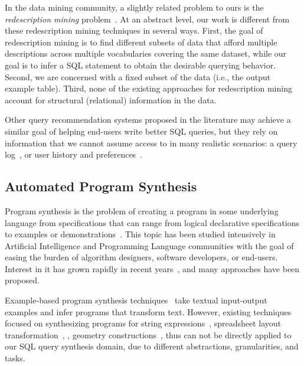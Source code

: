 In the data mining community, a slightly related problem to ours is
the \textit{redescription mining} problem~\cite{Ramakrishnan:2004}.
At an abstract level, our work is different from these redescription mining
techniques in several ways.
First, the goal of redescription mining is to find different subsets of
data that afford multiple descriptions across multiple vocabularies
covering the same dataset, while our goal is to infer a SQL statement
to obtain the desirable querying behavior.
Second, we are concerned with a fixed subset of the data (i.e., the output example table).
Third, none of the existing approaches for redescription mining account for
structural (relational) information in the data. 

Other query recommendation systems proposed in the literature may achieve
a similar goal of helping end-users write better SQL queries, but they rely on information
that we cannot assume access to in many realistic scenarios: a query log~\cite{Khoussainova:2010},
or user history and preferences~\cite{Howe:2011}.

\subsection{Automated Program Synthesis }

Program synthesis is the problem of creating a program
in some underlying language from specifications that can range
from logical declarative specifications to examples or
demonstrations~\cite{Harris:2011, singh:2012, Gulwani:2011}.
This topic has been studied intensively in Artificial Intelligence and
Programming Language communities with the goal of easing the burden of
algorithm designers, software developers, or end-users.
Interest in it has grown rapidly in recent years~\cite{Gulwani:2010:DPS},
and many approaches have been proposed.

Example-based program synthesis techniques~\cite{Kandel:2011, Fisher:2008,
Fisher08Pads,Lau:2003:PDU, Lau:2000:VSA, Barbosa:2010:MLA, Arasu:2009:LST}
take textual input-output examples and infer programs that transform text.
However, existing techniques focused on synthesizing programs for string
expressions~\cite{singh:2012, Gulwani:2011}, spreadsheet layout transformation~\cite{Harris:2011},
, geometry constructions~\cite{Gulwani:2011:SGC}, thus
can not be directly applied to our SQL query synthesis domain,
due to different abstractions, granularities, and tasks.

